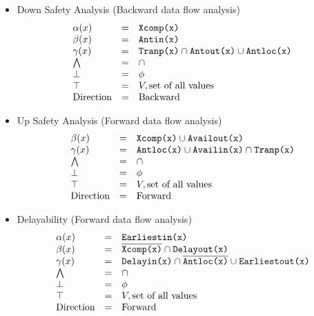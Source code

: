 \begin{itemize}
\item Down Safety Analysis (Backward data flow analysis)
\begin{equation}
\begin{array}{l c l}
\alpha(x)     &=& \texttt{Xcomp(x)} \\
\beta(x)      &=& \texttt{Antin(x)}     \\     
\gamma(x)   &=& \texttt{Tranp(x)} \cap \texttt{Antout(x)} \cup \texttt{Antloc(x)}\\
\bigwedge     &=&  \cap \\
\bot          &=& \phi \\
\top          &=& V, \text{set of all values} \\
\text{Direction}    &=& \text{Backward}
\end{array}
\end{equation}

\item Up Safety Analysis (Forward data flow analysis)
\begin{equation}
\begin{array}{l c l}
\beta(x)      &=& \texttt{Xcomp(x)} \cup \texttt{Availout(x)}     \\     
\gamma(x)   &=& \texttt{Antloc(x)} \cup \texttt{Availin(x)} \cap \texttt{Tranp(x)}\\
\bigwedge     &=&  \cap \\
\bot          &=& \phi \\
\top          &=& V, \text{set of all values} \\
\text{Direction}    &=& \text{Forward}
\end{array}
\end{equation}

\item Delayability (Forward data flow analysis)
\begin{equation}
\begin{array}{l c l}
\alpha(x)     &=& \texttt{Earliestin(x)} \\
\beta(x)      &=& \overline{\texttt{Xcomp(x)}} \cap \texttt{Delayout(x)}     \\     
\gamma(x)   &=& \texttt{Delayin(x)} \cap \overline{\texttt{Antloc(x)}} \cup \texttt{Earliestout(x)}\\
\bigwedge     &=&  \cap \\
\bot          &=& \phi \\
\top          &=& V, \text{set of all values} \\
\text{Direction}    &=& \text{Forward}
\end{array}
\end{equation}


\end{itemize}
